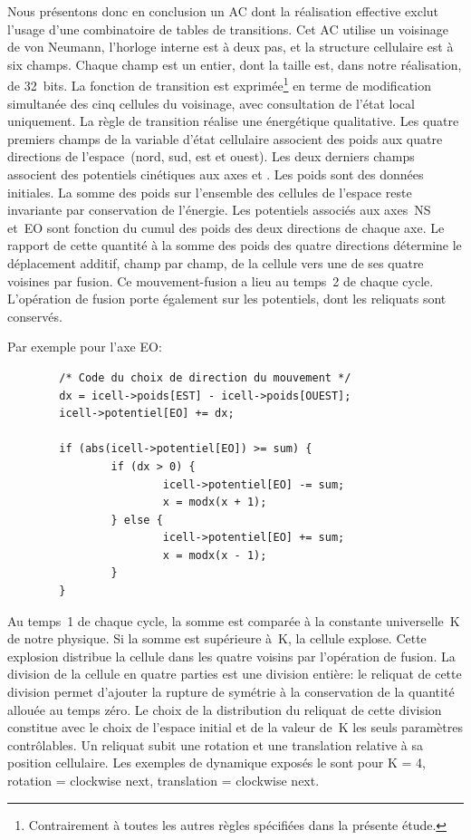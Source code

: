 Nous présentons donc en conclusion un AC dont la réalisation effective
exclut l'usage d'une combinatoire de tables de transitions. %
Cet AC utilise un voisinage de von Neumann, l'horloge interne est à
deux pas, et la structure cellulaire est à six champs. %
Chaque champ est un entier, dont la taille est, dans notre
réalisation, de 32~bits. %
La fonction de transition est exprimée\footnote{%
  Contrairement à toutes les autres règles spécifiées dans la présente étude.}%
en terme de modification simultanée des cinq cellules du voisinage,
avec consultation de l'état local uniquement. %
La règle de transition réalise une  énergétique
qualitative. %
Les quatre premiers champs de la variable d'état cellulaire associent
des poids aux quatre directions de l'espace~(nord, sud, est et
ouest). %
Les deux derniers champs associent des potentiels cinétiques aux axes
 et . %
Les poids sont des données initiales. %
La somme des poids sur l'ensemble des cellules de l'espace reste
invariante par conservation de l'énergie. %
Les potentiels associés aux axes~NS et~EO sont fonction du cumul des
poids des deux directions de chaque axe. %
Le rapport de cette quantité à la somme des poids des quatre
directions détermine le déplacement additif, champ par champ, de la
cellule vers une de ses quatre voisines par fusion. %
Ce mouvement-fusion a lieu au temps~2 de chaque cycle. %
L'opération de fusion porte également sur les potentiels, dont les
reliquats sont conservés. %

Par exemple pour l'axe EO:

\footnotesize
\begin{verbatim}
        /* Code du choix de direction du mouvement */
        dx = icell->poids[EST] - icell->poids[OUEST];
        icell->potentiel[EO] += dx;

        if (abs(icell->potentiel[EO]) >= sum) {
                if (dx > 0) {
                        icell->potentiel[EO] -= sum;
                        x = modx(x + 1);
                } else {
                        icell->potentiel[EO] += sum;
                        x = modx(x - 1);
                }
        }
\end{verbatim}
\normalsize

Au temps~1 de chaque cycle, la somme est comparée à la constante
universelle~K de notre physique. %
Si la somme est supérieure à~K, la cellule explose. %
Cette explosion distribue la cellule dans les quatre voisins par
l'opération de fusion. %
La division de la cellule en quatre parties est une division entière:
le reliquat de cette division permet d'ajouter la rupture de symétrie
à la conservation de la quantité allouée au temps zéro. %
Le choix de la distribution du reliquat de cette division constitue
avec le choix de l'espace initial et de la valeur de~K les seuls
paramètres contrôlables. %
Un reliquat subit une rotation et une translation relative à sa
position cellulaire. %
Les exemples de dynamique exposés le sont
pour K = 4, rotation = clockwise next, translation = clockwise next. %

